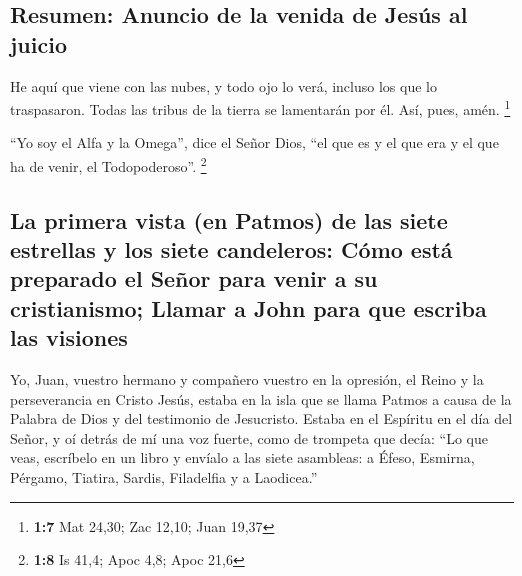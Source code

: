 \begin{paracol}{2}
\hypertarget{resumen-anuncio-de-la-venida-de-jesuxfas-al-juicio}{%
\subsection{Resumen: Anuncio de la venida de Jesús al
juicio}\label{resumen-anuncio-de-la-venida-de-jesuxfas-al-juicio}}

 He aquí que viene con las nubes, y todo ojo lo verá,
incluso los que lo traspasaron. Todas las tribus de la tierra se
lamentarán por él. Así, pues, amén. \footnote{\textbf{1:7} Mat 24,30;
  Zac 12,10; Juan 19,37}

 ``Yo soy el Alfa y la Omega'', dice el Señor Dios, ``el
que es y el que era y el que ha de venir, el Todopoderoso''. \footnote{\textbf{1:8}
  Is 41,4; Apoc 4,8; Apoc 21,6}

\hypertarget{la-primera-vista-en-patmos-de-las-siete-estrellas-y-los-siete-candeleros-cuxf3mo-estuxe1-preparado-el-seuxf1or-para-venir-a-su-cristianismo-llamar-a-john-para-que-escriba-las-visiones}{%
\subsection{La primera vista (en Patmos) de las siete estrellas y los
siete candeleros: Cómo está preparado el Señor para venir a su
cristianismo; Llamar a John para que escriba las
visiones}\label{la-primera-vista-en-patmos-de-las-siete-estrellas-y-los-siete-candeleros-cuxf3mo-estuxe1-preparado-el-seuxf1or-para-venir-a-su-cristianismo-llamar-a-john-para-que-escriba-las-visiones}}

 Yo, Juan, vuestro hermano y compañero vuestro en la
opresión, el Reino y la perseverancia en Cristo Jesús, estaba en la isla
que se llama Patmos a causa de la Palabra de Dios y del testimonio de
Jesucristo.  Estaba en el Espíritu en el día del Señor, y
oí detrás de mí una voz fuerte, como de trompeta  que
decía: ``Lo que veas, escríbelo en un libro y envíalo a las siete
asambleas: a Éfeso, Esmirna, Pérgamo, Tiatira, Sardis, Filadelfia y a
Laodicea.''


\end{paracol}
